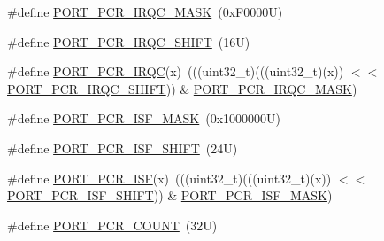 \begin{DoxyCompactItemize}
\item 
\#define \mbox{\hyperlink{group___p_o_r_t___register___masks_gabaef70d886fda0a7da8e862308bf5909}{P\+O\+R\+T\+\_\+\+P\+C\+R\+\_\+\+I\+R\+Q\+C\+\_\+\+M\+A\+SK}}~(0x\+F0000\+U)
\item 
\#define \mbox{\hyperlink{group___p_o_r_t___register___masks_ga0bda43cd85ca4d5df17f12a193937d81}{P\+O\+R\+T\+\_\+\+P\+C\+R\+\_\+\+I\+R\+Q\+C\+\_\+\+S\+H\+I\+FT}}~(16\+U)
\item 
\#define \mbox{\hyperlink{group___p_o_r_t___register___masks_ga7e6b6f68db9e76cf6fa34774c9b9b8f9}{P\+O\+R\+T\+\_\+\+P\+C\+R\+\_\+\+I\+R\+QC}}(x)~(((uint32\+\_\+t)(((uint32\+\_\+t)(x)) $<$$<$ \mbox{\hyperlink{group___p_o_r_t___register___masks_ga0bda43cd85ca4d5df17f12a193937d81}{P\+O\+R\+T\+\_\+\+P\+C\+R\+\_\+\+I\+R\+Q\+C\+\_\+\+S\+H\+I\+FT}})) \& \mbox{\hyperlink{group___p_o_r_t___register___masks_gabaef70d886fda0a7da8e862308bf5909}{P\+O\+R\+T\+\_\+\+P\+C\+R\+\_\+\+I\+R\+Q\+C\+\_\+\+M\+A\+SK}})
\item 
\#define \mbox{\hyperlink{group___p_o_r_t___register___masks_ga154d9308c2ab5b6a78ab04d9f3b08879}{P\+O\+R\+T\+\_\+\+P\+C\+R\+\_\+\+I\+S\+F\+\_\+\+M\+A\+SK}}~(0x1000000\+U)
\item 
\#define \mbox{\hyperlink{group___p_o_r_t___register___masks_ga5fbf95753704fb1d71da88299c11105e}{P\+O\+R\+T\+\_\+\+P\+C\+R\+\_\+\+I\+S\+F\+\_\+\+S\+H\+I\+FT}}~(24\+U)
\item 
\#define \mbox{\hyperlink{group___p_o_r_t___register___masks_ga88858366faa5d54510cb5c081289c075}{P\+O\+R\+T\+\_\+\+P\+C\+R\+\_\+\+I\+SF}}(x)~(((uint32\+\_\+t)(((uint32\+\_\+t)(x)) $<$$<$ \mbox{\hyperlink{group___p_o_r_t___register___masks_ga5fbf95753704fb1d71da88299c11105e}{P\+O\+R\+T\+\_\+\+P\+C\+R\+\_\+\+I\+S\+F\+\_\+\+S\+H\+I\+FT}})) \& \mbox{\hyperlink{group___p_o_r_t___register___masks_ga154d9308c2ab5b6a78ab04d9f3b08879}{P\+O\+R\+T\+\_\+\+P\+C\+R\+\_\+\+I\+S\+F\+\_\+\+M\+A\+SK}})
\item 
\#define \mbox{\hyperlink{group___p_o_r_t___register___masks_gae9d33dd352fbda70db758fa6daabf495}{P\+O\+R\+T\+\_\+\+P\+C\+R\+\_\+\+C\+O\+U\+NT}}~(32\+U)
\end{DoxyCompactItemize}
